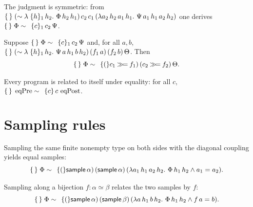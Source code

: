 \begin{theorem}[Symmetry]
  \label{thm:rhoare-symm}
  \leanok
  The judgment is symmetric: from
  $\rHoare\,(\lambda h_1\,h_2.\ \Phi\,h_2\,h_1)\,c_2\,c_1\,(\lambda a_2\,h_2\,a_1\,h_1.\ \Psi\,a_1\,h_1\,a_2\,h_2)$
  one derives $\{\,\}\;\Phi \sim \,\;\{c\}_1\,c_2\,\Psi$.
\end{theorem}

\begin{theorem}
  \label{thm:rhoare-bind}
  \leanok
  Suppose $\{\,\}\;\Phi \sim \,\;\{c\}_1\,c_2\,\Psi$ and, for all $a,b$,
  $\rHoare\,(\lambda h_1\,h_2.\ \Psi\,a\,h_1\,b\,h_2)\,(f_1\,a)\,(f_2\,b)\,\Theta$.
  Then
  \[
    \{\,\}\;\Phi \sim \,\;\{(\}c_1 \mathbin{\gg\!=} f_1)\,(c_2 \mathbin{\gg\!=} f_2)\,\Theta .
  \]
\end{theorem}

\begin{theorem}[Reflexivity]
  \label{thm:rhoare-refl}
  \leanok
  Every program is related to itself under equality: for all $c$,
  $\{\,\}\;\operatorname{eqPre} \sim \,\;\{c\}\,c\,\operatorname{eqPost}$.
\end{theorem}

\section{Sampling rules}

\begin{theorem}
  \label{thm:rhoare-sample-same}
  \leanok
  Sampling the same finite nonempty type on both sides with the diagonal
  coupling yields equal samples:
  \[
    \{\,\}\;\Phi \sim \,\;\{(\}\mathsf{sample}\,\alpha)\,(\mathsf{sample}\,\alpha)\,
      (\lambda a_1\,h_1\,a_2\,h_2.\ \Phi\,h_1\,h_2 \wedge a_1 = a_2).
  \]
\end{theorem}

\begin{theorem}
  \label{thm:rhoare-sample-bij}
  \leanok
  Sampling along a bijection $f : \alpha \simeq \beta$ relates the two samples by
  $f$:
  \[
    \{\,\}\;\Phi \sim \,\;\{(\}\mathsf{sample}\,\alpha)\,(\mathsf{sample}\,\beta)\,
      (\lambda a\,h_1\,b\,h_2.\ \Phi\,h_1\,h_2 \wedge f\,a = b).
  \]
\end{theorem}

